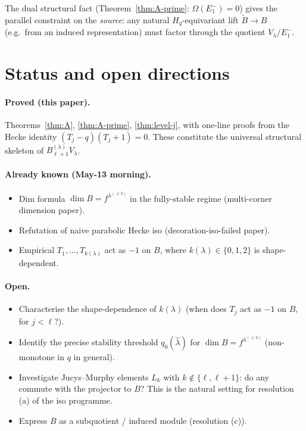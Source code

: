 \documentclass[11pt]{article}
\theoremstyle{definition}
\newcommand{\Hq}{H_q}
\newcommand{\Bdec}{B_{\ell+1}^{(\lambda)}}
\newcommand{\Om}{\Omega}
\begin{document}
The dual structural fact (Theorem~\ref{thm:A-prime}: $\Om(E_1^-) = 0$)
gives the parallel constraint on the \emph{source}: any natural
$\Hq$-equivariant lift $\widetilde B \to B$ (e.g.\ from an induced
representation) must factor through the quotient $V_\lambda / E_1^-$.

\section{Status and open directions}\label{sec:status}

\paragraph*{Proved (this paper).}
Theorems~\ref{thm:A}, \ref{thm:A-prime}, \ref{thm:level-j}, with
one-line proofs from the Hecke identity $(T_j-q)(T_j+1)=0$. These
constitute the universal structural skeleton of
$\Bdec V_\lambda$.

\paragraph*{Already known (May-13 morning).}
\begin{itemize}[topsep=0.2em,itemsep=0.1em]
\item Dim formula $\dim B = f^{\lambda^{(\ge 2)}}$ in the fully-stable
regime (multi-corner dimension paper).
\item Refutation of naive parabolic Hecke iso (decoration-iso-failed paper).
\item Empirical $T_1, \ldots, T_{k(\lambda)}$ act as $-1$ on $B$, where
$k(\lambda) \in \{0, 1, 2\}$ is shape-dependent.
\end{itemize}

\paragraph*{Open.}
\begin{itemize}[topsep=0.2em,itemsep=0.1em]
\item Characterise the shape-dependence of $k(\lambda)$ (when does $T_j$
act as $-1$ on $B$, for $j < \ell$?).
\item Identify the precise stability threshold $q_0(\widehat\lambda)$
for $\dim B = f^{\lambda^{(\ge 2)}}$ (non-monotone in $q$ in general).
\item Investigate Jucys--Murphy elements $L_k$ with
$k \notin \{\ell, \ell+1\}$: do any commute with the projector to $B$?
This is the natural setting for resolution (a) of the iso programme.
\item Express $B$ as a subquotient / induced module (resolution (c)).
\end{itemize}
\end{document}
